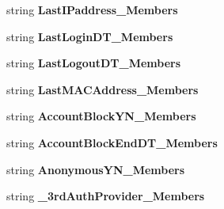 \begin{DoxyCompactItemize}
\item 
string {\bfseries Last\+I\+Paddress\+\_\+\+Members}\hypertarget{a00077_ab70c8fe9756ab1958d99dd6db127b3f6}{}\label{a00077_ab70c8fe9756ab1958d99dd6db127b3f6}

\item 
string {\bfseries Last\+Login\+D\+T\+\_\+\+Members}\hypertarget{a00077_ae23bf815fe7bf65b46210677181acd51}{}\label{a00077_ae23bf815fe7bf65b46210677181acd51}

\item 
string {\bfseries Last\+Logout\+D\+T\+\_\+\+Members}\hypertarget{a00077_a62182c2fdbdbb461564d754117befe9f}{}\label{a00077_a62182c2fdbdbb461564d754117befe9f}

\item 
string {\bfseries Last\+M\+A\+C\+Address\+\_\+\+Members}\hypertarget{a00077_a454b7909553ad088f72fab0a8906d37f}{}\label{a00077_a454b7909553ad088f72fab0a8906d37f}

\item 
string {\bfseries Account\+Block\+Y\+N\+\_\+\+Members}\hypertarget{a00077_a42e8d206bd01712a49e00e8852443a47}{}\label{a00077_a42e8d206bd01712a49e00e8852443a47}

\item 
string {\bfseries Account\+Block\+End\+D\+T\+\_\+\+Members}\hypertarget{a00077_a1781ad6a74b839c1bdff867c33e6ffa6}{}\label{a00077_a1781ad6a74b839c1bdff867c33e6ffa6}

\item 
string {\bfseries Anonymous\+Y\+N\+\_\+\+Members}\hypertarget{a00077_ae114de573692e448661e8a056da7e341}{}\label{a00077_ae114de573692e448661e8a056da7e341}

\item 
string {\bfseries \+\_\+3rd\+Auth\+Provider\+\_\+\+Members}\hypertarget{a00077_a73269a7480ac958818c613171a58b64b}{}\label{a00077_a73269a7480ac958818c613171a58b64b}


\end{DoxyCompactItemize}
